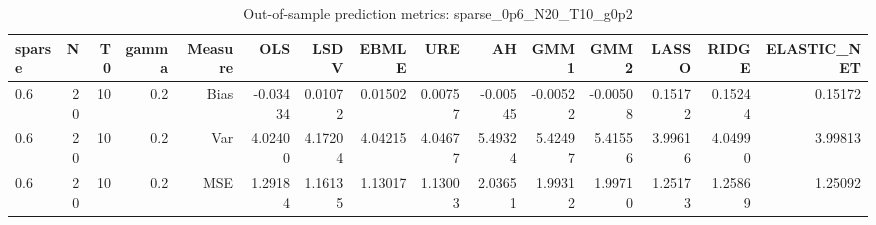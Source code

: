 \begin{table}[!htbp]\centering
\caption{Out-of-sample prediction metrics: sparse_0p6_N20_T10_g0p2}
\label{tab:table3_sparse_0p6_N20_T10_g0p2}
\begin{tabular}{lrrrrrrrrrrrrrr}
\hline
sparse & N & T0 & gamma & Measure & OLS & LSDV & EBMLE & URE & AH & GMM1 & GMM2 & LASSO & RIDGE & ELASTIC_NET \\
\hline
0.6 & 20 & 10 & 0.2 & Bias & -0.03434 & 0.01072 & 0.01502 & 0.00757 & -0.00545 & -0.00522 & -0.00508 & 0.15172 & 0.15244 & 0.15172 \\
0.6 & 20 & 10 & 0.2 & Var & 4.02400 & 4.17204 & 4.04215 & 4.04677 & 5.49324 & 5.42497 & 5.41556 & 3.99616 & 4.04990 & 3.99813 \\
0.6 & 20 & 10 & 0.2 & MSE & 1.29184 & 1.16135 & 1.13017 & 1.13003 & 2.03651 & 1.99312 & 1.99710 & 1.25173 & 1.25869 & 1.25092 \\
\hline
\end{tabular}
\end{table}

